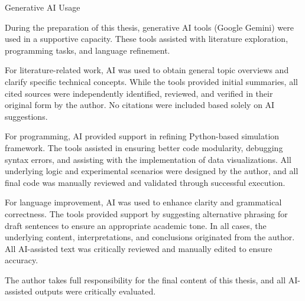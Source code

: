 \pagestyle{empty} %

\begin{center}
    \vspace*{1cm}
    {\Large Generative AI Usage} 
    \vspace{1cm}
\end{center}

During the preparation of this thesis, generative AI tools (Google Gemini) were used in a supportive capacity. These tools assisted with literature exploration, programming tasks, and language refinement.

For literature-related work, AI was used to obtain general topic overviews and clarify specific technical concepts. While the tools provided initial summaries, all cited sources were independently identified, reviewed, and verified in their original form by the author. No citations were included based solely on AI suggestions.

For programming, AI provided support in refining Python-based simulation framework. The tools assisted in ensuring better code modularity, debugging syntax errors, and assisting with the implementation of data visualizations. All underlying logic and experimental scenarios were designed by the author, and all final code was manually reviewed and validated through successful execution.

For language improvement, AI was used to enhance clarity and grammatical correctness. The tools provided support by suggesting alternative phrasing for draft sentences to ensure an appropriate academic tone. In all cases, the underlying content, interpretations, and conclusions originated from the author. All AI-assisted text was critically reviewed and manually edited to ensure accuracy.


The author takes full responsibility for the final content of this thesis, and all AI-assisted outputs were critically evaluated.

\newpage